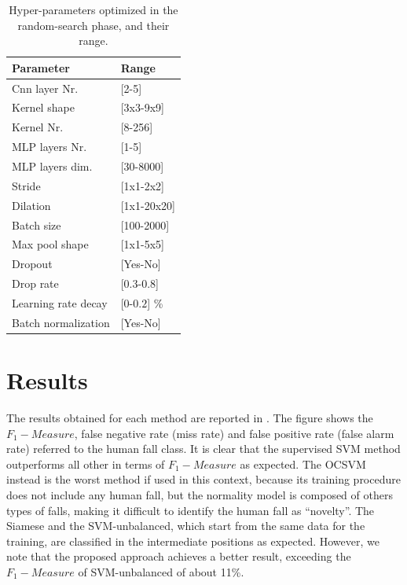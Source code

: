\begin{table}[htb]
	\caption{Hyper-parameters optimized in the random-search phase, and their range.}\label{tab:random_search_params}
	\centering
	
	\begin{tabular} {|K{4cm}|K{4cm}|}
		\hline
		\textbf{Parameter} 		& \textbf{Range} \\  
		\hline
		Cnn layer Nr. 	& [2-5]		                          \\
		\hline
		Kernel shape 	& [3x3-9x9]  \footnotemark[3]      \\
		\hline									
		Kernel Nr. 		& [8-256]	                            \\
		\hline                      
		MLP layers Nr. 	&	[1-5]	                          \\
		\hline
		MLP layers dim.	&[30-8000]                            \\
		\hline
		Stride & [1x1-2x2]			                          \\
		\hline
		Dilation & [1x1-20x20]\footnotemark[3]   \\
		\hline
		Batch size	&	[100-2000]                                    						\\
		\hline 
		Max pool shape & [1x1-5x5]\footnotemark[3]      \\
		\hline
		Dropout & [Yes-No]                    \\
		\hline
		Drop rate	&	[0.3-0.8]                         \\
		\hline
		Learning rate decay	&	[$0$-$0.2$] \%     \\
		\hline                
		Batch normalization	&	[Yes-No]                    \\
		\hline
		
	\end{tabular}
\end{table}



\section{Results}
\label{sec:Results}
The results obtained for each method are reported in . The figure shows the $ F_1 -Measure$, false negative rate (miss rate) and false positive rate (false alarm rate) referred to the human fall class. It is clear that the supervised SVM method outperforms all other in terms of  $ F_1 -Measure$ as expected. The OCSVM instead is the worst method if used in this context, because its training procedure does not include any human fall, but the normality model is composed of others types of falls, making it difficult to identify the human fall as ``novelty''. The Siamese and the SVM-unbalanced, which start from the same data for the training, are classified in the intermediate positions as expected. However, we note that the proposed approach achieves a better result, exceeding the $ F_1 -Measure$ of SVM-unbalanced of about 11\%. 

